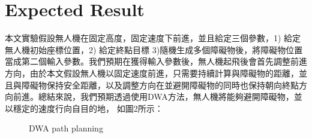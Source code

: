 \documentclass[crop=false]{standalone}
\begin{document}
	\section{Expected Result}
	本文實驗假設無人機在固定高度，固定速度下前進，並且給定三個參數，1) 給定無人機初始座標位置，2) 給定終點目標 3)隨機生成多個障礙物後，將障礙物位置當成第二個輸入參數。我們預期在獲得輸入參數後，無人機起飛後會首先調整前進方向，由於本文假設無人機以固定速度前進，只需要持續計算與障礙物的距離，並且與障礙物保持安全距離，以及調整方向在並避開障礙物的同時也保持朝向終點方向前進。總結來說，我們預期透過使用DWA方法，無人機將能夠避開障礙物，並以穩定的速度行向自目的地， 如圖2所示：   
    \begin{figure}[]	
    	\centering
		\vspace{-0.35cm} %


    	\quad

    


    	\caption{DWA path planning}
    	\label{fig:DWA path planning}
    \end{figure}
\end{document}
